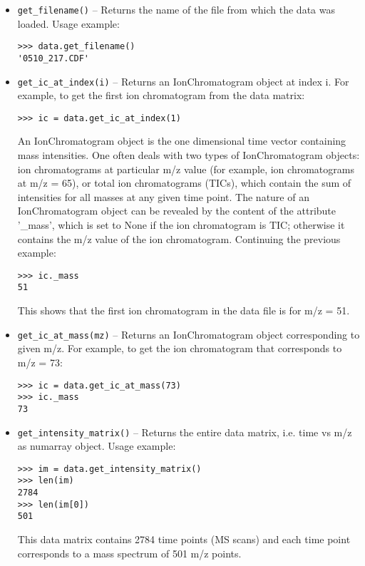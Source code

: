 \begin{itemize}

\item {\tt get\_filename()} -- Returns the name of the file from which
the data was loaded. Usage example:

\begin{verbatim}
>>> data.get_filename()
'0510_217.CDF'
\end{verbatim}

\item {\tt get\_ic\_at\_index(i)} -- Returns an IonChromatogram object
at index i.  For example, to get the first ion chromatogram from the data
matrix:

\begin{verbatim}
>>> ic = data.get_ic_at_index(1)
\end{verbatim}

\noindent
An IonChromatogram object is the one dimensional time vector containing
mass intensities.  One often deals with two types of IonChromatogram
objects: ion chromatograms at particular m/z value (for example, ion
chromatograms at m/z = 65), or total ion chromatograms (TICs), which
contain the sum of intensities for all masses at any given time point. 
The nature of an IonChromatogram object can be revealed by the content
of the attribute '\_mass', which is set to None if the ion chromatogram
is TIC; otherwise it contains the m/z value of the ion chromatogram.
Continuing the previous example:

\begin{verbatim}
>>> ic._mass
51
\end{verbatim}

\noindent
This shows that the first ion chromatogram in the data file is for
m/z = 51.

\item {\tt get\_ic\_at\_mass(mz)} -- Returns an IonChromatogram
object corresponding to given m/z. For example, to get the ion
chromatogram that corresponds to m/z = 73:

\begin{verbatim}
>>> ic = data.get_ic_at_mass(73)
>>> ic._mass
73
\end{verbatim}

\item {\tt get\_intensity\_matrix()} -- Returns the entire data
matrix, i.e. time vs m/z as numarray object. Usage example:

\begin{verbatim}
>>> im = data.get_intensity_matrix()
>>> len(im)
2784
>>> len(im[0])
501
\end{verbatim}

This data matrix contains 2784 time points (MS scans) and each time
point corresponds to a mass spectrum of 501 m/z points.

\end{itemize}

